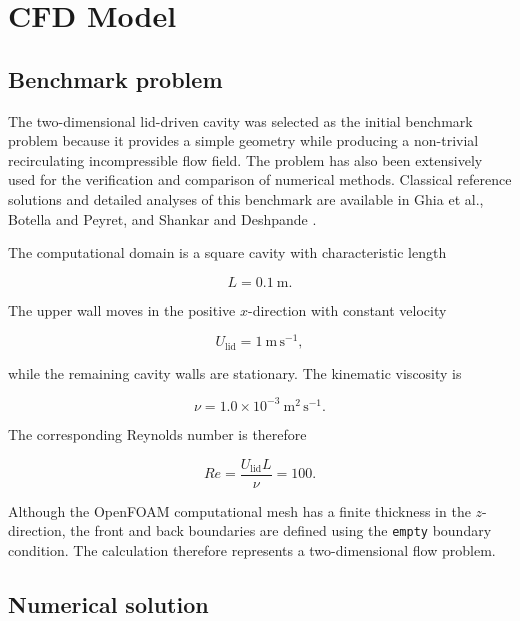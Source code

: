 \section{CFD Model}
\label{sec:cfd_model}

\subsection{Benchmark problem}

The two-dimensional lid-driven cavity was selected as the initial benchmark
problem because it provides a simple geometry while producing a non-trivial
recirculating incompressible flow field. The problem has also been extensively
used for the verification and comparison of numerical methods. Classical
reference solutions and detailed analyses of this benchmark are available in
Ghia et al., Botella and Peyret, and Shankar and Deshpande
\cite{ghia1982,botella1998,shankar2000}.

The computational domain is a square cavity with characteristic length

\begin{equation}
L = 0.1~\mathrm{m}.
\end{equation}

The upper wall moves in the positive \(x\)-direction with constant velocity

\begin{equation}
U_{\mathrm{lid}} = 1~\mathrm{m\,s^{-1}},
\end{equation}

while the remaining cavity walls are stationary. The kinematic viscosity is

\begin{equation}
\nu = 1.0\times10^{-3}~\mathrm{m^2\,s^{-1}}.
\end{equation}

The corresponding Reynolds number is therefore

\begin{equation}
Re =
\frac{U_{\mathrm{lid}}L}{\nu}
=
100.
\end{equation}

Although the OpenFOAM computational mesh has a finite thickness in the
\(z\)-direction, the front and back boundaries are defined using the
\texttt{empty} boundary condition. The calculation therefore represents a
two-dimensional flow problem.

\subsection{Numerical solution}

